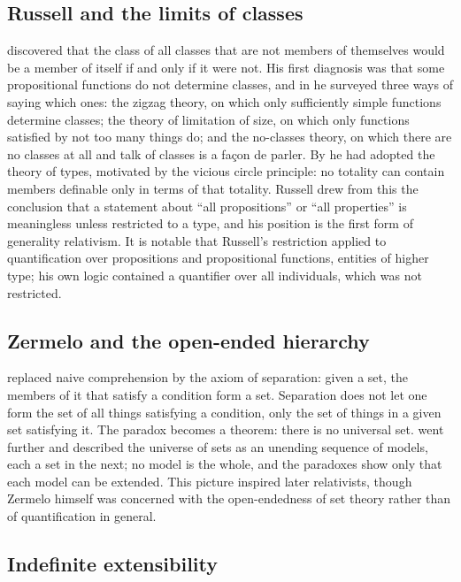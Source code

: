 \documentclass{situationist-preprint}
\begin{document}
\subsection{Russell and the limits of classes}

\citet{Russell1903} discovered that the class of all classes that are not members of themselves would be a member of itself if and only if it were not. His first diagnosis was that some propositional functions do not determine classes, and in \citet{Russell1906} he surveyed three ways of saying which ones: the zigzag theory, on which only sufficiently simple functions determine classes; the theory of limitation of size, on which only functions satisfied by not too many things do; and the no-classes theory, on which there are no classes at all and talk of classes is a façon de parler. By \citet{Russell1908} he had adopted the theory of types, motivated by the vicious circle principle: no totality can contain members definable only in terms of that totality. Russell drew from this the conclusion that a statement about \enquote{all propositions} or \enquote{all properties} is meaningless unless restricted to a type, and his position is the first form of generality relativism. It is notable that Russell's restriction applied to quantification over propositions and propositional functions, entities of higher type; his own logic contained a quantifier over all individuals, which was not restricted.

\subsection{Zermelo and the open-ended hierarchy}

\citet{Zermelo1908} replaced naive comprehension by the axiom of separation: given a set, the members of it that satisfy a condition form a set. Separation does not let one form the set of all things satisfying a condition, only the set of things in a given set satisfying it. The paradox becomes a theorem: there is no universal set. \citet{Zermelo1930} went further and described the universe of sets as an unending sequence of models, each a set in the next; no model is the whole, and the paradoxes show only that each model can be extended. This picture inspired later relativists, though Zermelo himself was concerned with the open-endedness of set theory rather than of quantification in general.

\subsection{Indefinite extensibility}
\end{document}
